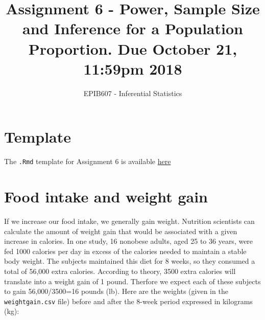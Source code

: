 \documentclass[letterpaper,9pt,twoside,printwatermark=false]{pinp}
\title{Assignment 6 - Power, Sample Size and Inference for a Population
Proportion. Due October 21, 11:59pm 2018}
\author[a]{EPIB607 - Inferential Statistics}
\affil[a]{Fall 2018, McGill University}
\begin{document}
\verticaladjustment{-2pt}

\maketitle
\thispagestyle{firststyle}



\section*{Template}\label{template}

The \texttt{.Rmd} template for Assignment 6 is available
\href{https://github.com/sahirbhatnagar/EPIB607/raw/master/assignments/a6/a6_template.Rmd}{here}

\section{Food intake and weight gain}\label{food-intake-and-weight-gain}

If we increase our food intake, we generally gain weight. Nutrition
scientists can calculate the amount of weight gain that would be
associated with a given increase in calories. In one study, 16 nonobese
adults, aged 25 to 36 years, were fed 1000 calories per day in excess of
the calories needed to maintain a stable body weight. The subjects
maintained this diet for 8 weeks, so they consumed a total of 56,000
extra calories. According to theory, 3500 extra calories will translate
into a weight gain of 1 pound. Therfore we expect each of these subjects
to gain 56,000/3500=16 pounds (lb). Here are the weights (given in the
\texttt{weightgain.csv} file) before and after the 8-week period
expressed in kilograms (kg):

\begin{Shaded}
\begin{Highlighting}[]
\StringTok{ }\NormalTok{(}\NormalTok{)}
\end{Highlighting}
\end{Shaded}
\end{document}
